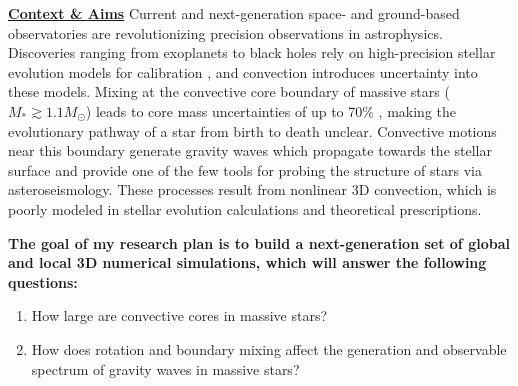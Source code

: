\documentclass[12pt]{article}
\newcommand{\sct}[1]{\vspace{0.3cm}\hspace{-\parindent}\textbf{\underline{#1}}\hspace{0.3cm}}
\begin{document}
\thispagestyle{fancy}

\sct{Context \& Aims}
Current and next-generation space- and ground-based observatories are revolutionizing precision observations in astrophysics.
Discoveries ranging from exoplanets to black holes rely on high-precision stellar evolution models for calibration \citep{mesa6}, and convection introduces uncertainty into these models.
Mixing at the convective core boundary of massive stars ($M_* \gtrsim 1.1 M_\odot$) leads to core mass uncertainties of up to 70\% \citep{kaiser_etal_2020}, making the evolutionary pathway of a star from birth to death unclear.
Convective motions near this boundary generate gravity waves which propagate towards the stellar surface and provide one of the few tools for probing the structure of stars via asteroseismology.
These processes result from nonlinear 3D convection, which is poorly modeled in stellar evolution calculations and theoretical prescriptions.

\textbf{The goal of my research plan is to build a next-generation set of global and local 3D numerical simulations, which will answer the following questions:}\vspace{-0.2cm}
\begin{enumerate}
    \item How large are convective cores in massive stars? \vspace{-0.2cm}
    \item How does rotation and boundary mixing affect the generation and observable spectrum of gravity waves in massive stars?
\end{enumerate}
\end{document}

